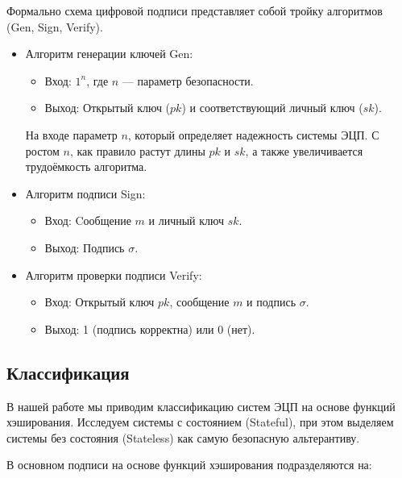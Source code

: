 \documentclass[a4paper, 14pt]{extarticle}
\begin{document}
\newpage

Формально схема цифровой подписи представляет собой тройку алгоритмов (Gen, Sign, Verify).

\begin{itemize}
    \item Алгоритм генерации ключей Gen:

    \begin{itemize}
        \item Вход: $1^{n}$, где $n$ --- параметр безопасности.
        \item Выход: Открытый ключ ($pk$) и соответствующий личный ключ ($sk$).
    \end{itemize}

    На входе параметр $n$, который определяет надежность системы ЭЦП. С ростом $n$, как правило растут длины $pk$ и $sk$, а также увеличивается трудоёмкость алгоритма.

    \item Алгоритм подписи Sign:

    \begin{itemize}
        \item Вход: Cообщение $m$ и личный ключ $sk$.
        \item Выход: Подпись $\sigma$.
    \end{itemize}

    \item Алгоритм проверки подписи Verify:

    \begin{itemize}
        \item Вход: Открытый ключ $pk$, сообщение $m$ и подпись $\sigma$.
        \item Выход: 1 (подпись корректна) или 0 (нет).
    \end{itemize}
\end{itemize}

\subsection{Классификация}
В нашей работе мы приводим классификацию систем ЭЦП на основе функций хэширования. Исследуем системы с состоянием (Stateful), при этом выделяем системы без состояния (Stateless) как самую безопасную альтерантиву.\newline

В основном подписи на основе функций хэширования подразделяются на:
\end{document}
